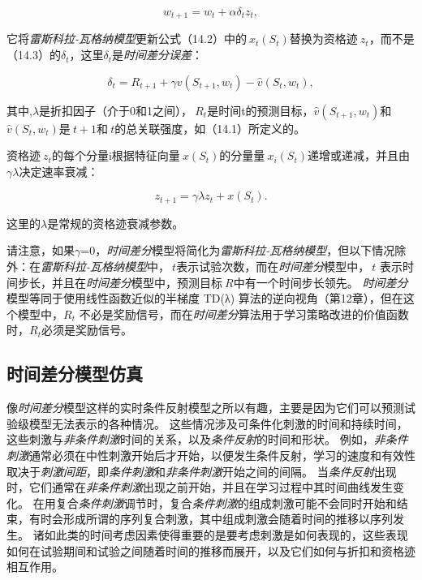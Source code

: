 \begin{equation}\label{key}
	w_{t+1} = w_t + \alpha \delta_t z_t,
\end{equation}

它将\textit{雷斯科拉-瓦格纳模型}更新公式（14.2）中的$\ x_t(S_t)$替换为资格迹$\ z_t$，而不是（14.3）的$\delta_t$，这里$\delta_t$是\textit{时间差分误差}：


\begin{equation}\label{eq:td_error}
	\delta_t = 
	R_{t+1} + \gamma v (S_{t+1}, w_t) - \hat v(S_t, w_t),
\end{equation}


其中,$\lambda$是折扣因子（介于0和1之间），$\ R_t$是时间t的预测目标，$\hat{v}(S_{t+1}, w_t)$和$\hat{v}(S_t, w_t)$是$\ t+1$和$\ t$的总关联强度，如（14.1）所定义的。


资格迹$\ z_t$的每个分量i根据特征向量$\ x(S_t)$的分量量$\ x_i(S_t)$递增或递减，并且由$\gamma \lambda$决定速率衰减：

\begin{equation}\label{key}
	z_{t+1} = \gamma \lambda z_t 
	+ x(S_t).
\end{equation}

这里的$\lambda$是常规的资格迹衰减参数。

请注意，如果$\gamma$=0，\textit{时间差分}模型将简化为\textit{雷斯科拉-瓦格纳模型}，但以下情况除外：在\textit{雷斯科拉-瓦格纳模型}中，$\ t$表示试验次数，而在\textit{时间差分}模型中，$\ t$
表示时间步长，并且在\textit{时间差分}模型中，预测目标$\ R$中有一个时间步长领先。
\textit{时间差分}模型等同于使用线性函数近似的半梯度 TD(λ) 算法的逆向视角（第12章），但在这个模型中，$ R_t$ 不必是奖励信号，而在\textit{时间差分}算法用于学习策略改进的价值函数时，$ R_t$必须是奖励信号。



\subsection{时间差分模型仿真} \label{sec:td_simulation}

像\textit{时间差分}模型这样的实时条件反射模型之所以有趣，主要是因为它们可以预测试验级模型无法表示的各种情况。
这些情况涉及可条件化刺激的时间和持续时间，这些刺激与\textit{非条件刺激}时间的关系，以及\textit{条件反射}的时间和形状。
例如，\textit{非条件刺激}通常必须在中性刺激开始后才开始，以便发生条件反射，学习的速度和有效性取决于\textit{刺激间距}，即\textit{条件刺激}和\textit{非条件刺激}开始之间的间隔。
当\textit{条件反射}出现时，它们通常在\textit{非条件刺激}出现之前开始，并且在学习过程中其时间曲线发生变化。
在用复合\textit{条件刺激}调节时，复合\textit{条件刺激}的组成刺激可能不会同时开始和结束，有时会形成所谓的序列复合刺激，其中组成刺激会随着时间的推移以序列发生。
诸如此类的时间考虑因素使得重要的是要考虑刺激是如何表现的，这些表现如何在试验期间和试验之间随着时间的推移而展开，以及它们如何与折扣和资格迹相互作用。


